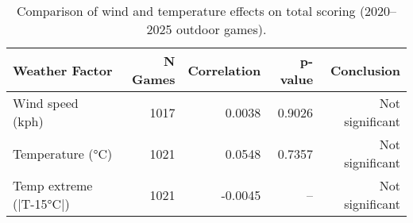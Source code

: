 \begin{table}[t]
  \centering
  \small
  \caption[Weather effects on scoring]{Comparison of wind and temperature effects on total scoring (2020--2025 outdoor games).}
  \label{tab:weather-effects}
  \setlength{\tabcolsep}{4pt}\renewcommand{\arraystretch}{1.12}
  \begin{tabular}{@{} l r r r r @{} }
    \toprule
    \textbf{Weather Factor} & \textbf{N Games} & \textbf{Correlation} & \textbf{p-value} & \textbf{Conclusion} \\
    \midrule
    Wind speed (kph) & 1017 & 0.0038 & 0.9026 & Not significant \\
    Temperature (°C) & 1021 & 0.0548 & 0.7357 & Not significant \\
    Temp extreme (|T-15°C|) & 1021 & -0.0045 & -- & Not significant \\
    \bottomrule
  \end{tabular}
\end{table}
